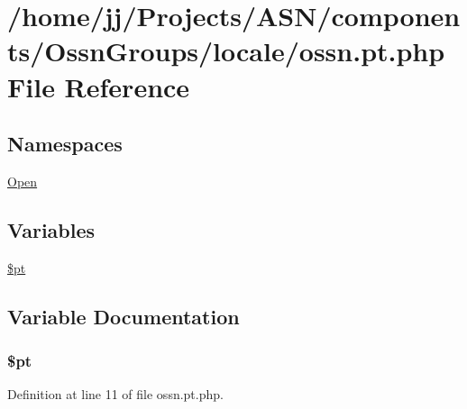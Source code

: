 \hypertarget{components_2_ossn_groups_2locale_2ossn_8pt_8php}{}\section{/home/jj/\+Projects/\+A\+S\+N/components/\+Ossn\+Groups/locale/ossn.pt.\+php File Reference}
\label{components_2_ossn_groups_2locale_2ossn_8pt_8php}
\subsection*{Namespaces}
\begin{DoxyCompactItemize}
\item 
 \hyperlink{namespace_open}{Open}
\end{DoxyCompactItemize}
\subsection*{Variables}
\begin{DoxyCompactItemize}
\item 
\hyperlink{components_2_ossn_groups_2locale_2ossn_8pt_8php_a62c150775a7a00e8663463c638016cad}{\$pt}
\end{DoxyCompactItemize}


\subsection{Variable Documentation}
\subsubsection[{\texorpdfstring{\$pt}{$pt}}]{\setlength{\rightskip}{0pt plus 5cm}\$pt}\hypertarget{components_2_ossn_groups_2locale_2ossn_8pt_8php_a62c150775a7a00e8663463c638016cad}{}\label{components_2_ossn_groups_2locale_2ossn_8pt_8php_a62c150775a7a00e8663463c638016cad}


Definition at line 11 of file ossn.\+pt.\+php.

